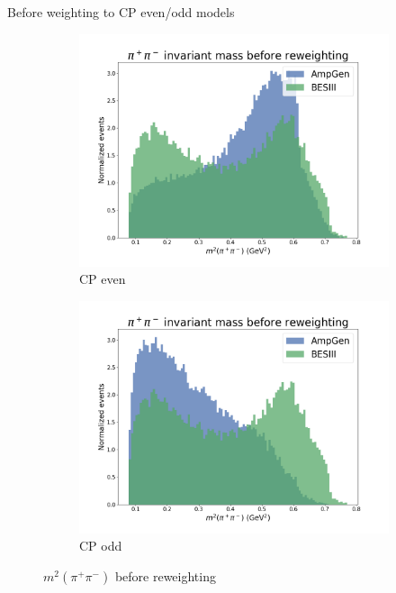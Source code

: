 \documentclass{beamer}
\begin{document}
\begin{frame}{Before weighting to CP even/odd models}
  \begin{figure}
    \begin{subfigure}{0.50\textwidth}
      \includegraphics[width = 1.0\textwidth]{Plots/s23_BeforeReweighting_CPEven.png}
      \caption{CP even}
    \end{subfigure}%
    \begin{subfigure}{0.50\textwidth}
      \includegraphics[width = 1.0\textwidth]{Plots/s23_BeforeReweighting_CPOdd.png}
      \caption{CP odd}
    \end{subfigure}
    \caption{$m^2(\pi^+\pi^-)$ before reweighting}
  \end{figure}
\end{frame}
\end{document}
